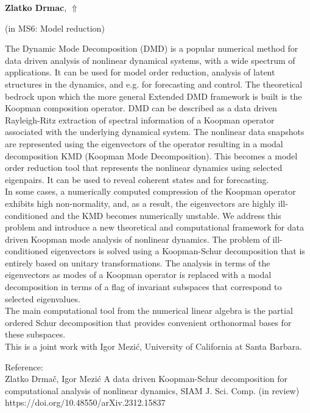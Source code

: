 \documentclass[ILAS2025-program.tex]{subfiles}
\begin{document}
\hypertarget{down0131}{}\begin{ilasabstract}
    
\textbf{Zlatko Drmac},  \hfill \hyperlink{up0131}{$\Uparrow$}
    
    
(in {\color{mstitle}MS6: Model reduction})
        
\mtskip
    The Dynamic Mode Decomposition (DMD) is a popular numerical method
for data driven analysis of nonlinear dynamical systems, with a wide spectrum 
of applications. It can be used for model order reduction, analysis of
latent structures in the dynamics, and e.g. for forecasting and control.  The
theoretical bedrock upon which the more general Extended DMD framework 
is built is the Koopman composition operator.
%
DMD can be described as a data driven Rayleigh-Ritz extraction of spectral information
of a Koopman operator associated with the underlying dynamical system. 
The nonlinear data snapshots are represented using the eigenvectors of the
operator resulting in a modal decomposition KMD (Koopman Mode Decomposition).
This becomes a model order reduction tool that represents the nonlinear dynamics
using selected eigenpairs. It can be used to reveal coherent states and for forecasting. \\
In some cases, a numerically computed compression of the Koopman operator exhibits 
high non-normality, and, as a result, the eigenvectors are highly ill-conditioned and the
KMD becomes numerically unstable.
%
We address this problem and introduce a new theoretical and computational framework for
data driven Koopman mode analysis of nonlinear dynamics. The 
problem of ill-conditioned eigenvectors  is solved using a Koopman-Schur 
decomposition that is entirely 
based on unitary transformations. The analysis in terms of the eigenvectors as 
modes of a Koopman operator  is replaced with a modal decomposition 
in terms of a flag of invariant subspaces that correspond to selected eigenvalues. 
  \\
%
The main computational tool from the numerical linear algebra is the partial 
ordered Schur decomposition that provides convenient orthonormal bases for these 
subspaces. \\
%
This is a joint work with Igor Mezi\'{c}, University of California at Santa Barbara.
%

Reference:\\
Zlatko Drma\v{c}, Igor Mezi\'{c} A data driven Koopman-Schur decomposition for 
computational analysis of nonlinear dynamics, SIAM J. Sci. Comp. (in review)\\
https://doi.org/10.48550/arXiv.2312.15837




\end{ilasabstract}
    
\end{document}
